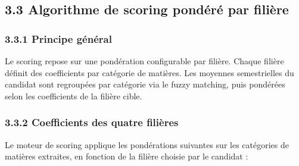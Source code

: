 \documentclass[
]{article}
\begin{document}
\hypertarget{algorithme-de-scoring-ponduxe9ruxe9-par-filiuxe8re}{%
\subsection{3.3 Algorithme de scoring pondéré par
filière}\label{algorithme-de-scoring-ponduxe9ruxe9-par-filiuxe8re}}

\hypertarget{principe-guxe9nuxe9ral}{%
\subsubsection{3.3.1 Principe général}\label{principe-guxe9nuxe9ral}}

Le scoring repose sur une pondération configurable par filière. Chaque
filière définit des coefficients par catégorie de matières. Les moyennes
semestrielles du candidat sont regroupées par catégorie via le fuzzy
matching, puis pondérées selon les coefficients de la filière cible.

\hypertarget{coefficients-des-quatre-filiuxe8res}{%
\subsubsection{3.3.2 Coefficients des quatre
filières}\label{coefficients-des-quatre-filiuxe8res}}

Le moteur de scoring applique les pondérations suivantes sur les
catégories de matières extraites, en fonction de la filière choisie par
le candidat :
\end{document}
